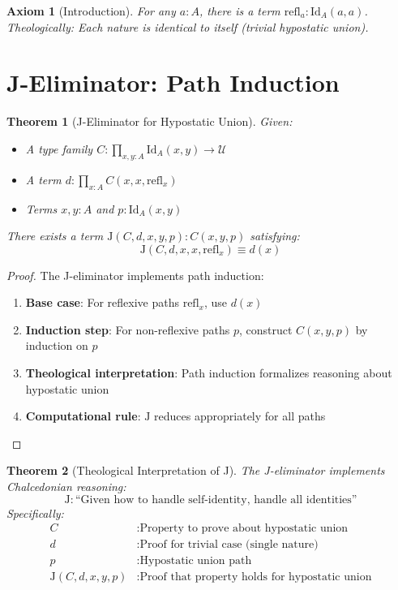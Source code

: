 \documentclass{article}
\newtheorem{theorem}{Theorem}
\newtheorem{axiom}{Axiom}
\begin{document}
\begin{axiom}[Introduction]
For any $a : A$, there is a term $\mathrm{refl}_a : \mathrm{Id}_A(a, a)$. Theologically: Each nature is identical to itself (trivial hypostatic union).
\end{axiom}

\section{J-Eliminator: Path Induction}

\begin{theorem}[J-Eliminator for Hypostatic Union]
Given:
\begin{itemize}
    \item A type family $C : \prod_{x,y:A} \mathrm{Id}_A(x, y) \to \mathcal{U}$
    \item A term $d : \prod_{x:A} C(x, x, \mathrm{refl}_x)$
    \item Terms $x, y : A$ and $p : \mathrm{Id}_A(x, y)$
\end{itemize}
There exists a term $\mathrm{J}(C, d, x, y, p) : C(x, y, p)$ satisfying:
\[
\mathrm{J}(C, d, x, x, \mathrm{refl}_x) \equiv d(x)
\]
\end{theorem}

\begin{proof}
The J-eliminator implements path induction:
\begin{enumerate}
    \item \textbf{Base case}: For reflexive paths $\mathrm{refl}_x$, use $d(x)$
    \item \textbf{Induction step}: For non-reflexive paths $p$, construct $C(x, y, p)$ by induction on $p$
    \item \textbf{Theological interpretation}: Path induction formalizes reasoning about hypostatic union
    \item \textbf{Computational rule}: $\mathrm{J}$ reduces appropriately for all paths
\end{enumerate}
\end{proof}

\begin{theorem}[Theological Interpretation of J]
The J-eliminator implements Chalcedonian reasoning:
\[
\mathrm{J} : \text{``Given how to handle self-identity, handle all identities''}
\]
Specifically:
\begin{align*}
C &: \text{Property to prove about hypostatic union} \\
d &: \text{Proof for trivial case (single nature)} \\
p &: \text{Hypostatic union path} \\
\mathrm{J}(C, d, x, y, p) &: \text{Proof that property holds for hypostatic union}
\end{align*}
\end{theorem}
\end{document}
